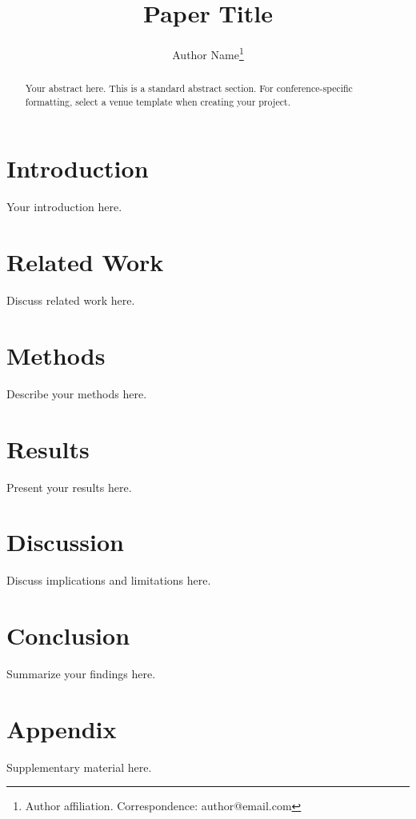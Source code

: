 \documentclass[11pt]{article}
\title{Paper Title}
\author{Author Name\thanks{Author affiliation. Correspondence: author@email.com}}
\date{}
\begin{document}
\maketitle

\begin{abstract}
Your abstract here. This is a standard abstract section.
For conference-specific formatting, select a venue template when creating your project.
\end{abstract}

\section{Introduction}
\label{sec:introduction}

Your introduction here.

\section{Related Work}
\label{sec:related-work}

Discuss related work here.

\section{Methods}
\label{sec:methods}

Describe your methods here.

\section{Results}
\label{sec:results}

Present your results here.

\section{Discussion}
\label{sec:discussion}

Discuss implications and limitations here.

\section{Conclusion}
\label{sec:conclusion}

Summarize your findings here.




\appendix
\section{Appendix}
\label{sec:appendix}

Supplementary material here.
\end{document}

